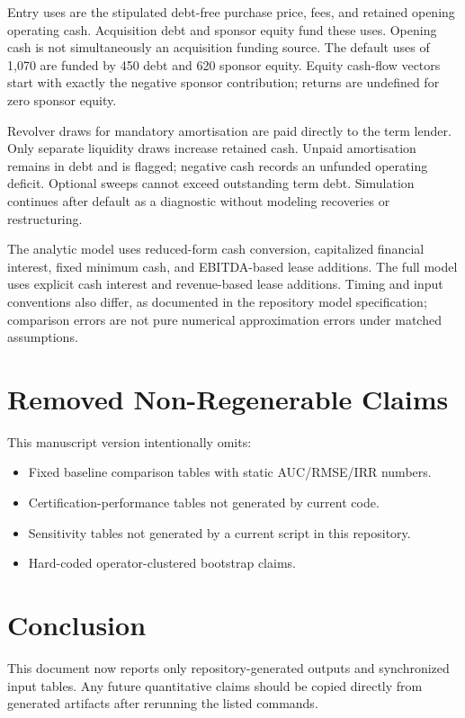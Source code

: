 ﻿\documentclass[11pt,a4paper]{article}
\begin{document}
Entry uses are the stipulated debt-free purchase price, fees, and retained opening operating cash. Acquisition debt and sponsor equity fund these uses. Opening cash is not simultaneously an acquisition funding source. The default uses of 1,070 are funded by 450 debt and 620 sponsor equity. Equity cash-flow vectors start with exactly the negative sponsor contribution; returns are undefined for zero sponsor equity.

Revolver draws for mandatory amortisation are paid directly to the term lender. Only separate liquidity draws increase retained cash. Unpaid amortisation remains in debt and is flagged; negative cash records an unfunded operating deficit. Optional sweeps cannot exceed outstanding term debt. Simulation continues after default as a diagnostic without modeling recoveries or restructuring.

The analytic model uses reduced-form cash conversion, capitalized financial interest, fixed minimum cash, and EBITDA-based lease additions. The full model uses explicit cash interest and revenue-based lease additions. Timing and input conventions also differ, as documented in the repository model specification; comparison errors are not pure numerical approximation errors under matched assumptions.

\section{Removed Non-Regenerable Claims}

This manuscript version intentionally omits:
\begin{itemize}
\item Fixed baseline comparison tables with static AUC/RMSE/IRR numbers.
\item Certification-performance tables not generated by current code.
\item Sensitivity tables not generated by a current script in this repository.
\item Hard-coded operator-clustered bootstrap claims.
\end{itemize}

\section{Conclusion}

This document now reports only repository-generated outputs and synchronized input tables. Any future quantitative claims should be copied directly from generated artifacts after rerunning the listed commands.
\end{document}
